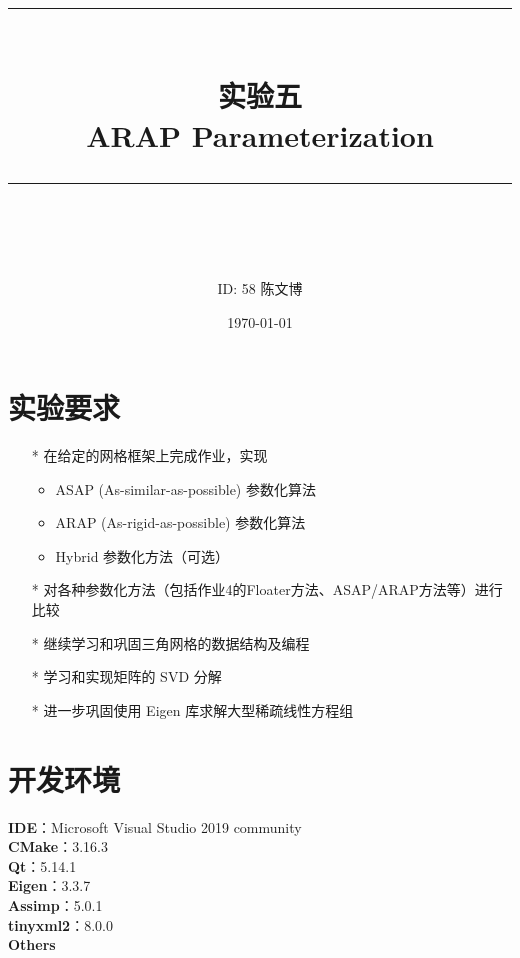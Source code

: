 \documentclass[14pt]{scrartcl} %
\title{	
	\normalfont\normalsize
	\rule{\linewidth}{0.5pt}\\ %
	\vspace{20pt} %
	{\huge 实验五	\\ARAP Parameterization}\\ %
	\vspace{12pt} %
	\rule{\linewidth}{2pt}\\ %
	\vspace{12pt} %
}
\author{\LARGE ID: 58		陈文博} %
\date{\normalsize\today} %
\begin{document}
\maketitle %


\section{实验要求}


\begin{itemize}
	\item[*] 在给定的网格框架上完成作业，实现
	\begin{itemize}
		\item ASAP (As-similar-as-possible) 参数化算法
		\item ARAP (As-rigid-as-possible) 参数化算法
		\item Hybrid 参数化方法（可选）
	\end{itemize}
	\item[*] 对各种参数化方法（包括作业4的Floater方法、ASAP/ARAP方法等）进行比较
	\item[*] 继续学习和巩固三角网格的数据结构及编程
	\item[*] 学习和实现矩阵的 SVD 分解
	\item[*] 进一步巩固使用 Eigen 库求解大型稀疏线性方程组
	

\end{itemize}


\section{开发环境}

\textbf{IDE}：Microsoft Visual Studio 2019 community\\
\textbf{CMake}：3.16.3\\
\textbf{Qt}：5.14.1\\
\textbf{Eigen}：3.3.7\\
\textbf{Assimp}：5.0.1\\
\textbf{tinyxml2}：8.0.0\\
\textbf{Others}
\end{document}
